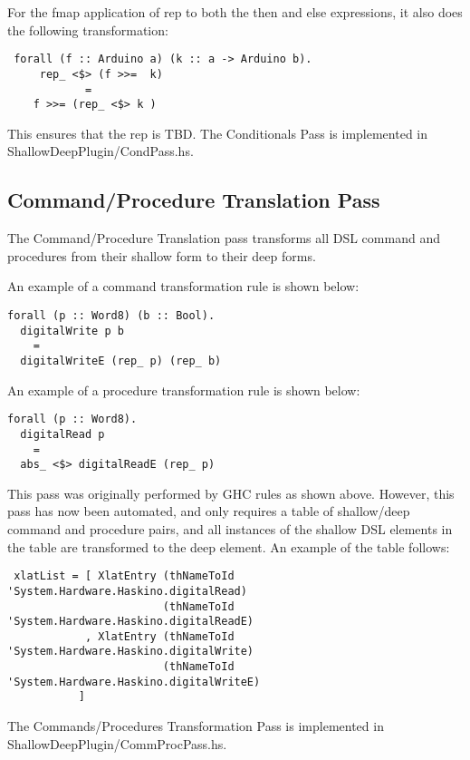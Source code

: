 \documentclass[11pt, oneside]{article}   	%
\begin{document}
For the fmap application of rep to both the then and else expressions, it also
does the following transformation:

\begin{verbatim}
 forall (f :: Arduino a) (k :: a -> Arduino b).
     rep_ <$> (f >>=  k)
            =
    f >>= (rep_ <$> k )
\end{verbatim}

This ensures that the rep is TBD.
The Conditionals Pass is implemented in ShallowDeepPlugin/CondPass.hs.

\subsection{Command/Procedure Translation Pass}

The Command/Procedure Translation pass transforms all DSL command and procedures from their 
shallow form to their deep forms.

An example of a command transformation rule is shown below:

\begin{verbatim}
forall (p :: Word8) (b :: Bool).  
  digitalWrite p b  
    =  
  digitalWriteE (rep_ p) (rep_ b)  
\end{verbatim}

An example of a procedure transformation rule is shown below:

\begin{verbatim}
forall (p :: Word8).
  digitalRead p 
    =  
  abs_ <$> digitalReadE (rep_ p)
 \end{verbatim}

This pass was originally performed by GHC rules as shown above.  However,
this pass has now been automated, and only requires a table of shallow/deep
command and procedure pairs, and all instances of the shallow DSL elements
in the table are transformed to the deep element. An example of the table follows:

\begin{verbatim}
 xlatList = [ XlatEntry (thNameToId 'System.Hardware.Haskino.digitalRead)
                        (thNameToId 'System.Hardware.Haskino.digitalReadE)
            , XlatEntry (thNameToId 'System.Hardware.Haskino.digitalWrite)
                        (thNameToId 'System.Hardware.Haskino.digitalWriteE)
           ]
\end{verbatim}

The Commands/Procedures Transformation Pass is implemented in ShallowDeepPlugin/CommProcPass.hs.
\end{document}
